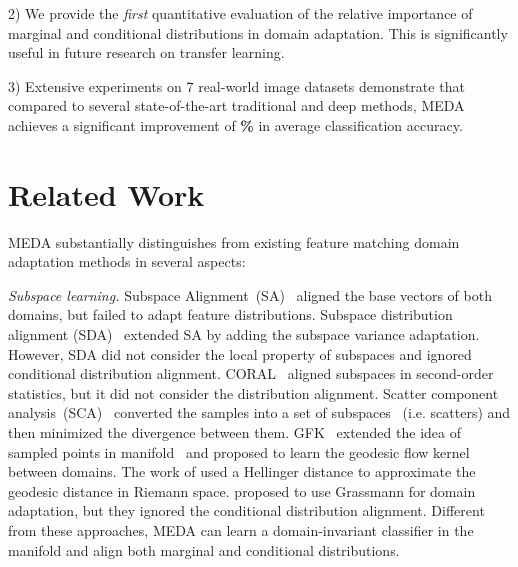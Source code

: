 \documentclass[sigconf]{acmart}
\begin{document}
2) We provide the \textit{first} quantitative evaluation of the relative importance of marginal and conditional distributions in domain adaptation. This is significantly useful in future research on transfer learning.

3) Extensive experiments on 7 real-world image datasets demonstrate that compared to several state-of-the-art traditional and deep methods, MEDA achieves a significant improvement of \textbf{\%} in average classification accuracy.

\section{Related Work}
\label{sec-related}

MEDA substantially distinguishes from existing feature matching domain adaptation methods in several aspects:

\textit{Subspace learning.} Subspace Alignment~(SA)~\cite{fernando2013unsupervised} aligned the base vectors of both domains, but failed to adapt feature distributions. Subspace distribution alignment (SDA)~\cite{sun2015subspace} extended SA by adding the subspace variance adaptation. However, SDA did not consider the local property of subspaces and ignored conditional distribution alignment. CORAL~\cite{sun2016return} aligned subspaces in second-order statistics, but it did not consider the distribution alignment. Scatter component analysis~(SCA)~\cite{ghifary2017scatter} converted the samples into a set of subspaces ~(i.e. scatters) and then minimized the divergence between them. GFK~\cite{gong2012geodesic} extended the idea of sampled points in manifold~\cite{gopalan2011domain} and proposed to learn the geodesic flow kernel between domains. The work of \cite{baktashmotlagh2014domain} used a Hellinger distance to approximate the geodesic distance in Riemann space. \cite{baktashmotlagh2013unsupervised} proposed to use Grassmann for domain adaptation, but they ignored the conditional distribution alignment. Different from these approaches, MEDA can learn a domain-invariant classifier in the manifold and align both marginal and conditional distributions.
\end{document}
